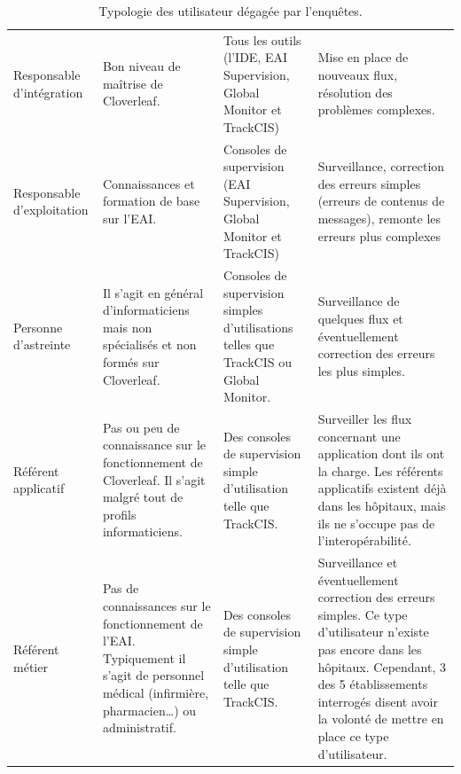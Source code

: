 			\begin{table}[H]
				\centering
				\begin{tabular}{| p{3cm} | p{4,5cm} | p{} | p{} |} %
					\hline
						\thead{Utilisateur}
						&\thead{Niveau de maitrise}
						&\thead{Outils utilisés}
						&\thead{Rôles}
						\\
					\hline
						Responsable d'intégration
						&
						Bon niveau de maîtrise de Cloverleaf.
						&
						Tous les outils (l'IDE, EAI Supervision, Global Monitor et TrackCIS)
						&
						Mise en place de nouveaux flux, résolution des problèmes complexes.
						\\
					\hline
						Responsable d'exploitation
						&
						Connaissances et formation de base sur l’EAI.
						&
						Consoles de supervision (EAI Supervision, Global Monitor et TrackCIS)
						&
						Surveillance, correction des erreurs simples (erreurs de contenus de
						messages), remonte les erreurs plus complexes
						\\
					\hline
						Personne d'astreinte
						&
						Il s'agit en général d'informaticiens mais non spécialisés et non formés
						sur Cloverleaf.
						&
						Consoles de supervision simples d'utilisations telles que TrackCIS ou
						Global Monitor.
						&
						Surveillance de quelques flux et éventuellement correction des erreurs les
						plus simples.
						\\
					\hline
						Référent applicatif
						&
						Pas ou peu de connaissance sur le fonctionnement de Cloverleaf. Il s'agit
						malgré tout de profils informaticiens.
						&
						Des consoles de supervision simple d'utilisation telle que TrackCIS.
						&
						Surveiller les flux concernant une application dont ils ont la charge. Les
						référents applicatifs existent déjà dans les hôpitaux, mais ils ne
						s'occupe pas de l'interopérabilité.
						\\
					\hline
						Référent métier
						&
						Pas de connaissances sur le fonctionnement de l’EAI. Typiquement il s'agit
						de personnel médical (infirmière, pharmacien\ldots) ou administratif.
						&
						Des consoles de supervision simple d'utilisation telle que TrackCIS.
						&
						Surveillance et éventuellement correction des erreurs simples. Ce type
						d'utilisateur n'existe pas encore dans les hôpitaux. Cependant, 3 des 5
						établissements interrogés disent avoir la volonté de mettre en place ce
						type d'utilisateur.
						\\
					\hline
				\end{tabular}
				\caption{\label{type_utilisateurs} Typologie des utilisateur dégagée par
				l'enquêtes.}
			\end{table}
